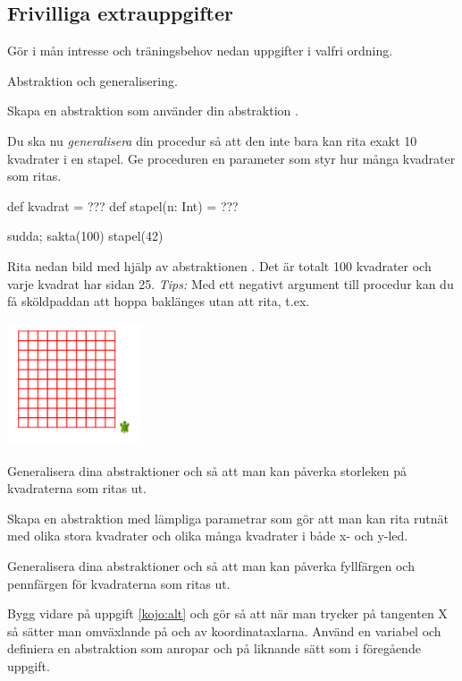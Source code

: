 \subsection{Frivilliga extrauppgifter}

\noindent Gör i mån intresse och träningsbehov nedan uppgifter i valfri ordning.

\Task Abstraktion och generalisering.

\Subtask Skapa en abstraktion  som använder din abstraktion .

\Subtask Du ska nu \emph{generalisera} din procedur så att den inte bara kan rita exakt 10 kvadrater i en stapel. Ge proceduren  en parameter  som styr hur många kvadrater som ritas.
\begin{Code}
def kvadrat = ???
def stapel(n: Int) = ???

sudda; sakta(100)
stapel(42)
\end{Code}



\Subtask Rita nedan bild med hjälp av abstraktionen . Det är totalt 100 kvadrater och varje kvadrat har sidan 25. \emph{Tips:} Med ett negativt argument till procedur  kan du få sköldpaddan att hoppa baklänges utan att rita, t.ex. 

\includegraphics[width=0.3\textwidth]{../img/kojo/square-grid}

\Subtask Generalisera dina abstraktioner  och  så att man kan påverka storleken på kvadraterna som ritas ut.

\Subtask Skapa en abstraktion  med lämpliga parametrar som gör att man kan rita rutnät med olika stora kvadrater och olika många kvadrater i både x- och y-led.

\Subtask Generalisera dina abstraktioner  och  så att man kan påverka fyllfärgen och pennfärgen för kvadraterna som ritas ut.

\Task Bygg vidare på uppgift \ref{kojo:alt} och gör så att när man trycker på tangenten X så sätter man omväxlande på och av koordinataxlarna. Använd en variabel  och definiera en abstraktion  som anropar  och  på liknande sätt som i föregående uppgift.


